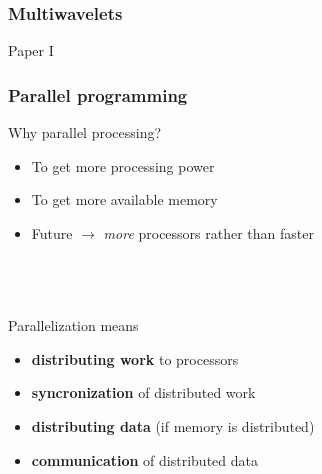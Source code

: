 \documentclass[mathserif]{beamer}
\begin{document}
\begin{frame}
    \frametitle{Multiwavelets}
    Paper I
\end{frame}

\begin{frame}
    \frametitle{Parallel programming}
    Why parallel processing?
    \begin{itemize}
	\item	To get more processing power
	\item	To get more available memory
	\item	Future $\rightarrow$ \emph{more} processors rather than faster
    \end{itemize}
    \ \\
    \ \\
    \ \\
    Parallelization means
    \begin{itemize}
	\item	\textbf{distributing work} to processors
	\item	\textbf{syncronization} of distributed work
	\item	\textbf{distributing data} (if memory is distributed)
	\item	\textbf{communication} of distributed data
    \end{itemize}
\end{frame}
\end{document}

